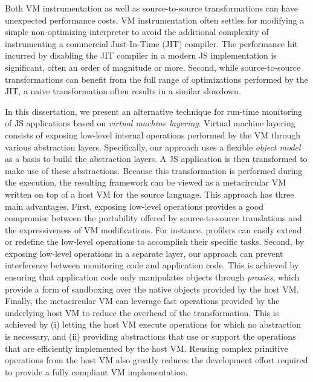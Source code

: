 Both VM instrumentation as well as source-to-source transformations can have
unexpected performance costs. VM instrumentation often settles for
modifying a simple non-optimizing interpreter to avoid the additional
complexity of instrumenting a commercial Just-In-Time (JIT) compiler. The
performance hit incurred by disabling the JIT compiler in a modern JS
implementation is significant, often an order of magnitude or more. Second,
while source-to-source transformations can benefit from the full range of
optimizations performed by the JIT, a naive transformation often results in a
similar slowdown.

In this dissertation, we present an alternative technique for run-time
monitoring of JS applications based on \emph{virtual machine layering}. Virtual
machine layering consists of exposing low-level internal operations performed
by the VM through various abstraction layers. Specifically, our approach uses a
flexible \emph{object model} as a basis to build the abstraction layers.  A JS
application is then transformed to make use of these abstractions. Because this
transformation is performed during the execution, the resulting framework can
be viewed as a metacircular VM written on top of a host VM for the source
language. This approach has three main advantages. First, exposing low-level
operations provides a good compromise between the portability offered by
source-to-source translations and the expressiveness of VM modifications. For
instance, profilers can easily extend or redefine the low-level operations to
accomplish their specific tasks. Second, by exposing low-level operations in a
separate layer, our approach can prevent interference between monitoring code and application 
code. This is achieved by ensuring that application code only manipulates objects
through \emph{proxies}, which provide a form of sandboxing over the native
objects provided by the host VM. Finally, the metacircular VM can leverage fast
operations provided by the underlying host VM to reduce the overhead of the
transformation. This is achieved by (i) letting the host VM execute operations
for which no abstraction is necessary, and (ii) providing abstractions that use
or support the operations that are efficiently implemented by the host VM.
Reusing complex primitive operations from the host VM also greatly reduces the
development effort required to provide a fully compliant VM implementation.

